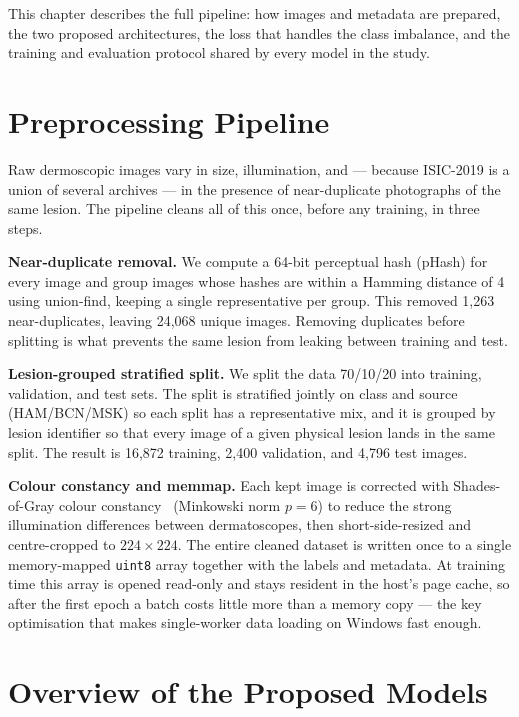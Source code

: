 This chapter describes the full pipeline: how images and metadata are prepared,
the two proposed architectures, the loss that handles the class imbalance, and
the training and evaluation protocol shared by every model in the study.

\section{Preprocessing Pipeline}

Raw dermoscopic images vary in size, illumination, and --- because ISIC-2019 is
a union of several archives --- in the presence of near-duplicate photographs of
the same lesion. The pipeline cleans all of this once, before any training, in
three steps.

\textbf{Near-duplicate removal.} We compute a 64-bit perceptual hash (pHash) for
every image and group images whose hashes are within a Hamming distance of 4
using union-find, keeping a single representative per group. This removed
1{,}263 near-duplicates, leaving 24{,}068 unique images. Removing duplicates
before splitting is what prevents the same lesion from leaking between training
and test.

\textbf{Lesion-grouped stratified split.} We split the data 70/10/20 into
training, validation, and test sets. The split is stratified jointly on class
and source (HAM/BCN/MSK) so each split has a representative mix, and it is
grouped by lesion identifier so that every image of a given physical lesion lands
in the same split. The result is 16{,}872 training, 2{,}400 validation, and
4{,}796 test images.

\textbf{Colour constancy and memmap.} Each kept image is corrected with
Shades-of-Gray colour constancy~\cite{finlayson2004shadesofgray} (Minkowski norm
$p=6$) to reduce the strong illumination differences between dermatoscopes,
then short-side-resized and centre-cropped to $224\times224$. The entire cleaned
dataset is written once to a single memory-mapped \texttt{uint8} array together
with the labels and metadata. At training time this array is opened read-only and
stays resident in the host's page cache, so after the first epoch a batch costs
little more than a memory copy --- the key optimisation that makes single-worker
data loading on Windows fast enough.

\section{Overview of the Proposed Models}

